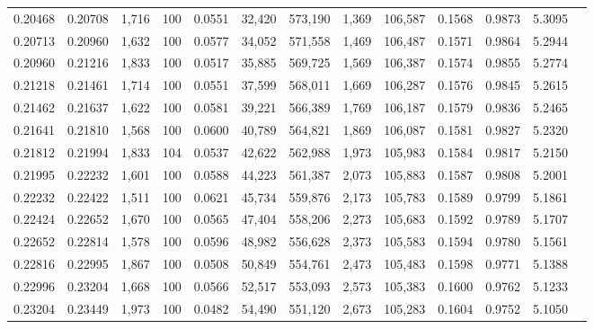 \begin{tabular}{rrrrrrrrrrrrr}
0.20468 & 0.20708 & 1,716 & 100 &                                     0.0551 &  32,420 & 573,190 &   1,369 & 106,587 & 0.1568 & 0.9873 & 5.3095 \\
0.20713 & 0.20960 & 1,632 & 100 &                                     0.0577 &  34,052 & 571,558 &   1,469 & 106,487 & 0.1571 & 0.9864 & 5.2944 \\
0.20960 & 0.21216 & 1,833 & 100 &                                     0.0517 &  35,885 & 569,725 &   1,569 & 106,387 & 0.1574 & 0.9855 & 5.2774 \\
0.21218 & 0.21461 & 1,714 & 100 &                                     0.0551 &  37,599 & 568,011 &   1,669 & 106,287 & 0.1576 & 0.9845 & 5.2615 \\
0.21462 & 0.21637 & 1,622 & 100 &                                     0.0581 &  39,221 & 566,389 &   1,769 & 106,187 & 0.1579 & 0.9836 & 5.2465 \\
0.21641 & 0.21810 & 1,568 & 100 &                                     0.0600 &  40,789 & 564,821 &   1,869 & 106,087 & 0.1581 & 0.9827 & 5.2320 \\
0.21812 & 0.21994 & 1,833 & 104 &                                     0.0537 &  42,622 & 562,988 &   1,973 & 105,983 & 0.1584 & 0.9817 & 5.2150 \\
0.21995 & 0.22232 & 1,601 & 100 &                                     0.0588 &  44,223 & 561,387 &   2,073 & 105,883 & 0.1587 & 0.9808 & 5.2001 \\
0.22232 & 0.22422 & 1,511 & 100 &                                     0.0621 &  45,734 & 559,876 &   2,173 & 105,783 & 0.1589 & 0.9799 & 5.1861 \\
0.22424 & 0.22652 & 1,670 & 100 &                                     0.0565 &  47,404 & 558,206 &   2,273 & 105,683 & 0.1592 & 0.9789 & 5.1707 \\
0.22652 & 0.22814 & 1,578 & 100 &                                     0.0596 &  48,982 & 556,628 &   2,373 & 105,583 & 0.1594 & 0.9780 & 5.1561 \\
0.22816 & 0.22995 & 1,867 & 100 &                                     0.0508 &  50,849 & 554,761 &   2,473 & 105,483 & 0.1598 & 0.9771 & 5.1388 \\
0.22996 & 0.23204 & 1,668 & 100 &                                     0.0566 &  52,517 & 553,093 &   2,573 & 105,383 & 0.1600 & 0.9762 & 5.1233 \\
0.23204 & 0.23449 & 1,973 & 100 &                                     0.0482 &  54,490 & 551,120 &   2,673 & 105,283 & 0.1604 & 0.9752 & 5.1050 \\

\end{tabular}

